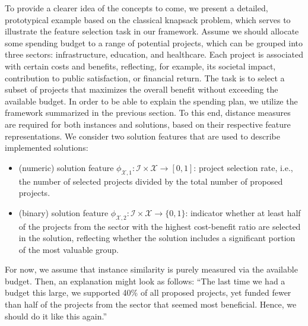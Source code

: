 \documentclass[11pt, a4paper]{article}
\newcommand{\MGil}[1]{\todo[color=gray, textcolor=black, inline, author=MG]{#1}}
\begin{document}

To provide a clearer idea of the concepts to come, we present a detailed, prototypical example based on the classical knapsack problem, which serves to illustrate the feature selection task in our framework. Assume we should allocate some spending budget to a range of potential projects, which can be grouped into three sectors: infrastructure, education, and healthcare. Each project is associated with certain costs and benefits, reflecting, for example, its societal impact, contribution to public satisfaction, or financial return.
The task is to select a subset of projects that maximizes the overall benefit without exceeding the available budget. In order to be able to explain the spending plan, we utilize the framework summarized in the previous section. To this end, distance measures are required for both instances and solutions, based on their respective feature representations. We consider two solution features that are used to describe implemented solutions:
\begin{itemize}
	\item (numeric) solution feature $\phi_{\mathcal{X},1}: \mathcal{I}\times \mathcal{X} \rightarrow [0,1]$: project selection rate, i.e., the number of selected projects divided by the total number of proposed projects.
	\item (binary) solution feature $\phi_{\mathcal{X},2}: \mathcal{I}\times \mathcal{X} \rightarrow \{0,1\}$: indicator whether at least half of the projects from the sector with the highest cost-benefit ratio are selected in the solution, reflecting whether the solution includes a significant portion of the most valuable group.
\end{itemize}
For now, we assume that instance similarity is purely measured via the available budget.
Then, an explanation might look as follows: ``The last time we had a budget this large, we supported 40\% of all proposed projects, yet funded fewer than half of the projects from the sector that seemed most beneficial. Hence, we should do it like this again.''
\end{document}
